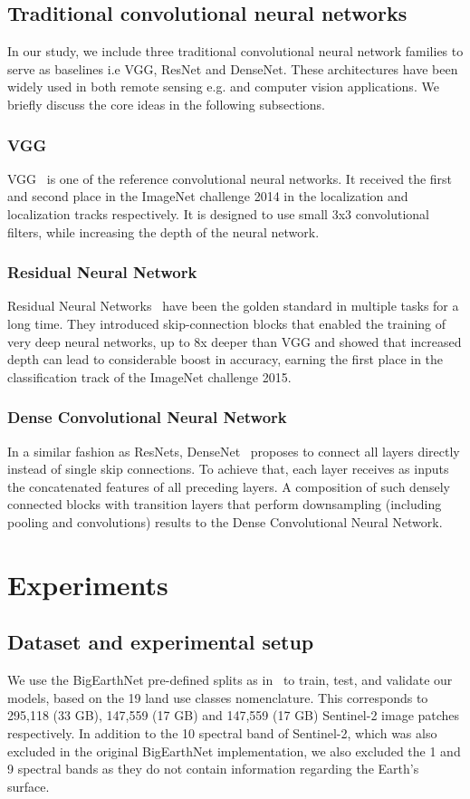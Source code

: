 \documentclass[journal]{IEEEtran}
\begin{document}
\subsection{Traditional convolutional neural networks}
In our study, we include three traditional convolutional neural network families to serve as baselines i.e VGG, ResNet and DenseNet. These architectures have been widely used in both remote sensing e.g. \citep{sumbul2021bigearthnetmm,helber2019eurosat,kakogeorgiou2021evaluating} and computer vision applications. We briefly discuss the core ideas in the following subsections.
\subsubsection{VGG}
VGG~\citep{simonyan2015deep} is one of the reference convolutional neural networks. It received the first and second place in the ImageNet challenge 2014 in the localization and localization tracks respectively. It is designed to use small 3x3 convolutional filters, while increasing the depth of the neural network.

\subsubsection{Residual Neural Network}
Residual Neural Networks~\citep{He_2016_CVPR} have been the golden standard in multiple tasks for a long time. They introduced skip-connection blocks that enabled the training of very deep neural networks, up to 8x deeper than VGG and showed that increased depth can lead to considerable boost in accuracy, earning the first place in the classification track of the ImageNet challenge 2015.
\subsubsection{Dense Convolutional Neural Network}
In a similar fashion as ResNets, DenseNet~\citep{Huang_2017_CVPR} proposes to connect all layers directly instead of single skip connections. To achieve that, each layer receives as inputs the concatenated features of all preceding layers. A composition of such densely connected blocks with transition layers that perform downsampling (including pooling and convolutions) results to the Dense Convolutional Neural Network.


\section{Experiments}
\subsection{Dataset and experimental setup}
We use the BigEarthNet pre-defined splits as in~\cite{9552024} to train, test, and validate our models, based on the 19 land use classes nomenclature. This corresponds to 295,118 (33 GB), 147,559 (17 GB) and 147,559  (17 GB) Sentinel-2 image patches respectively. In addition to the 10 spectral band of Sentinel-2, which was also excluded in the original BigEarthNet implementation, we also excluded the 1 and 9 spectral bands as they do not contain information regarding the Earth’s surface.
\end{document}

